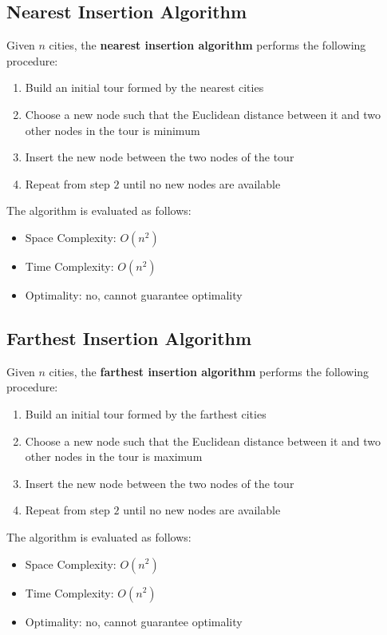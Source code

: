 \documentclass{article}
\begin{document}
\subsection{Nearest Insertion Algorithm}
Given $n$ cities, the \textbf{nearest insertion algorithm} performs the following procedure:
\begin{enumerate}
    \item Build an initial tour formed by the nearest cities
    \item Choose a new node such that the Euclidean distance between it and two other nodes in the tour is minimum
    \item Insert the new node between the two nodes of the tour
    \item Repeat from step $2$ until no new nodes are available
\end{enumerate}
The algorithm is evaluated as follows:
\begin{itemize}
    \item Space Complexity: $O(n^2)$
    \item Time Complexity: $O(n^2)$
    \item Optimality: no, cannot guarantee optimality
\end{itemize}
\newpage
\subsection{Farthest Insertion Algorithm}
Given $n$ cities, the \textbf{farthest insertion algorithm} performs the following procedure:
\begin{enumerate}
    \item Build an initial tour formed by the farthest cities
    \item Choose a new node such that the Euclidean distance between it and two other nodes in the tour is maximum
    \item Insert the new node between the two nodes of the tour
    \item Repeat from step $2$ until no new nodes are available
\end{enumerate}
The algorithm is evaluated as follows:
\begin{itemize}
    \item Space Complexity: $O(n^2)$
    \item Time Complexity: $O(n^2)$
    \item Optimality: no, cannot guarantee optimality
\end{itemize}
\end{document}
